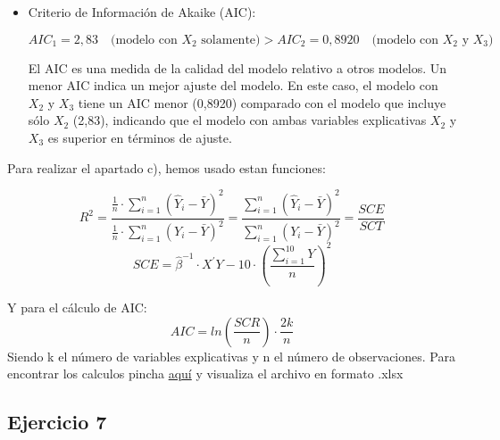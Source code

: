 \documentclass[a4paper,12pt]{article}
\begin{document}
\begin{itemize}
\begin{itemize}
    \item Criterio de Información de Akaike (AIC):
    

\[
    AIC_1 = 2,83 \quad \text{(modelo con \(X_2\) solamente)} > AIC_2 = 0,8920 \quad \text{(modelo con \(X_2\) y \(X_3\))}
    \]


    El AIC es una medida de la calidad del modelo relativo a otros modelos. Un menor AIC indica un mejor ajuste del modelo. En este caso, el modelo con \(X_2\) y \(X_3\) tiene un AIC menor (0,8920) comparado con el modelo que incluye sólo \(X_2\) (2,83), indicando que el modelo con ambas variables explicativas \(X_2\) y \(X_3\) es superior en términos de ajuste.
  \end{itemize}
\end{itemize}

Para realizar el apartado c), hemos usado estan funciones:

     \begin{equation}
        R^2 = \frac{\frac{1}{n} \cdot \sum_{i=1}^{n} \left( \hat{Y}_i - \bar{Y} \right)^2}{\frac{1}{n} \cdot \sum_{i=1}^{n} \left( Y_i - \bar{Y} \right)^2} = \frac{\sum_{i=1}^{n} \left( \hat{Y}_i - \bar{Y} \right)^2}{\sum_{i=1}^{n} \left( Y_i - \bar{Y} \right)^2} = \frac{SCE}{SCT}
        \end{equation}
     \begin{equation}
        SCE = \hat{\beta}^{-1} \cdot X^{\prime}Y - 10 \cdot \left(\frac{\sum_{i=1}^{10}Y}{n}\right)^{2}    
    \end{equation}
    
    
Y para el cálculo de AIC:
\begin{equation}
    AIC = ln (\frac{SCR}{n}) \cdot \frac{2k}{n}
\end{equation}
Siendo k el número de variables explicativas y n el número de observaciones.
Para encontrar los calculos pincha \href{https://github.com/ElblogdeIsmael/ElblogdeIsmael.github.io/tree/main/Asignaturas/Tercer%20A%C3%B1o/ECO/Practicas/EjerciciosPropuestos/SolucionesEjercicios/Tema2}{aquí} y visualiza el archivo en formato .xlsx

\subsection{Ejercicio 7}
\end{document}
